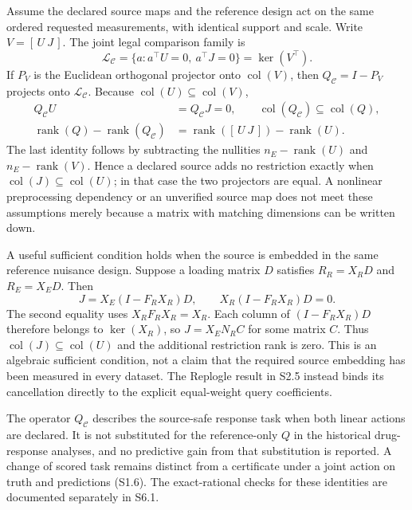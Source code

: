 \documentclass[11pt]{article}
\begin{document}
Assume the declared source maps and the reference design act on the same ordered requested measurements, with identical support and scale. Write $V=[\,U\ J\,]$. The joint legal comparison family is
\[
\mathcal L_{\mathcal C}=\{a:a^\top U=0,\ a^\top J=0\}=\ker(V^\top).
\]
If $P_V$ is the Euclidean orthogonal projector onto $\operatorname{col}(V)$, then $Q_{\mathcal C}=I-P_V$ projects onto $\mathcal L_{\mathcal C}$. Because $\operatorname{col}(U)\subseteq\operatorname{col}(V)$,
\[
\begin{aligned}
Q_{\mathcal C}U&=Q_{\mathcal C}J=0,\qquad
\operatorname{col}(Q_{\mathcal C})\subseteq\operatorname{col}(Q),\\
\operatorname{rank}(Q)-\operatorname{rank}(Q_{\mathcal C})
 &=\operatorname{rank}([\,U\ J\,])-\operatorname{rank}(U).
\end{aligned}
\]
The last identity follows by subtracting the nullities $n_E-\operatorname{rank}(U)$ and $n_E-\operatorname{rank}(V)$. Hence a declared source adds no restriction exactly when $\operatorname{col}(J)\subseteq\operatorname{col}(U)$; in that case the two projectors are equal. A nonlinear preprocessing dependency or an unverified source map does not meet these assumptions merely because a matrix with matching dimensions can be written down.

A useful sufficient condition holds when the source is embedded in the same reference nuisance design. Suppose a loading matrix $D$ satisfies $R_R=X_RD$ and $R_E=X_ED$. Then
\[
J=X_E(I-F_RX_R)D,\qquad X_R(I-F_RX_R)D=0.
\]
The second equality uses $X_RF_RX_R=X_R$. Each column of $(I-F_RX_R)D$ therefore belongs to $\ker(X_R)$, so $J=X_EN_RC$ for some matrix $C$. Thus $\operatorname{col}(J)\subseteq\operatorname{col}(U)$ and the additional restriction rank is zero. This is an algebraic sufficient condition, not a claim that the required source embedding has been measured in every dataset. The Replogle result in S2.5 instead binds its cancellation directly to the explicit equal-weight query coefficients.

The operator $Q_{\mathcal C}$ describes the source-safe response task when both linear actions are declared. It is not substituted for the reference-only $Q$ in the historical drug-response analyses, and no predictive gain from that substitution is reported. A change of scored task remains distinct from a certificate under a joint action on truth and predictions (S1.6). The exact-rational checks for these identities are documented separately in S6.1.
\end{document}

